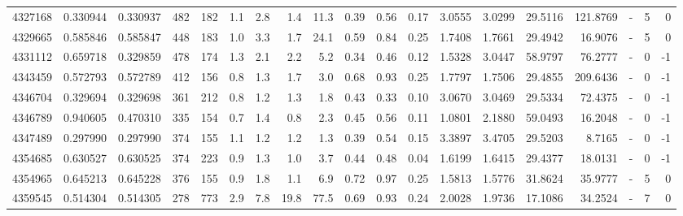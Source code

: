 \begin{tabular}{rrrrrrrrrrrrrrrrlrr}
   4327168 & 0.330944 &   0.330937 &  482 &  182 &      1.1 &      2.8 &     1.4 &     11.3 &       0.39 &        0.56 &        0.17 &  3.0555 &  3.0299 &   29.5116 &  121.8769 &             - &        5 &          0 \\
   4329665 & 0.585846 &   0.585847 &  448 &  183 &      1.0 &      3.3 &     1.7 &     24.1 &       0.59 &        0.84 &        0.25 &  1.7408 &  1.7661 &   29.4942 &   16.9076 &             - &        5 &          0 \\
   4331112 & 0.659718 &   0.329859 &  478 &  174 &      1.3 &      2.1 &     2.2 &      5.2 &       0.34 &        0.46 &        0.12 &  1.5328 &  3.0447 &   58.9797 &   76.2777 &             - &        0 &         -1 \\
   4343459 & 0.572793 &   0.572789 &  412 &  156 &      0.8 &      1.3 &     1.7 &      3.0 &       0.68 &        0.93 &        0.25 &  1.7797 &  1.7506 &   29.4855 &  209.6436 &             - &        0 &         -1 \\
   4346704 & 0.329694 &   0.329698 &  361 &  212 &      0.8 &      1.2 &     1.3 &      1.8 &       0.43 &        0.33 &        0.10 &  3.0670 &  3.0469 &   29.5334 &   72.4375 &             - &        0 &         -1 \\
   4346789 & 0.940605 &   0.470310 &  335 &  154 &      0.7 &      1.4 &     0.8 &      2.3 &       0.45 &        0.56 &        0.11 &  1.0801 &  2.1880 &   59.0493 &   16.2048 &             - &        0 &         -1 \\
   4347489 & 0.297990 &   0.297990 &  374 &  155 &      1.1 &      1.2 &     1.2 &      1.3 &       0.39 &        0.54 &        0.15 &  3.3897 &  3.4705 &   29.5203 &    8.7165 &             - &        0 &         -1 \\
   4354685 & 0.630527 &   0.630525 &  374 &  223 &      0.9 &      1.3 &     1.0 &      3.7 &       0.44 &        0.48 &        0.04 &  1.6199 &  1.6415 &   29.4377 &   18.0131 &             - &        0 &         -1 \\
   4354965 & 0.645213 &   0.645228 &  376 &  155 &      0.9 &      1.8 &     1.1 &      6.9 &       0.72 &        0.97 &        0.25 &  1.5813 &  1.5776 &   31.8624 &   35.9777 &             - &        5 &          0 \\
   4359545 & 0.514304 &   0.514305 &  278 &  773 &      2.9 &      7.8 &    19.8 &     77.5 &       0.69 &        0.93 &        0.24 &  2.0028 &  1.9736 &   17.1086 &   34.2524 &             - &        7 &          0 \\

\end{tabular}
